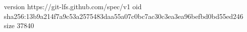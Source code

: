 version https://git-lfs.github.com/spec/v1
oid sha256:13b9a214f7a9c53a2575483daa55a07c0bc7ac30c3ea3ea96befbd0bd55ed246
size 37840
